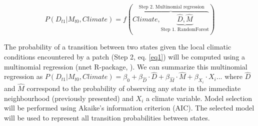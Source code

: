 \begin{equation}
	P(D_{t1}|M_{t0}, Climate) = f(\overbrace{Climate, \underbrace{\hat{D}, \hat{M}}_\text{Step 1. RandomForest}}^\text{ Step 2. Multinomial regression})
\label{eq1}
\end{equation}

The probability of a transition between two states given the local climatic
conditions encountered by a patch (Step 2, eq. \ref{eq1}) will be computed using
a multinomial regression (nnet R-package, \cite{Venables2002}). We can
summarize this multinomial regression as $P(D_{t1}|M_{t0},Climate) = \beta_0 +
\beta_{\hat{D}} \cdot \hat{D} + \beta_{\hat{M}} \cdot \hat{M} + \beta_{X_i}
\cdot X_i... $ where $\hat{D}$ and $\hat{M}$ correspond to the probability of
observing any state in the immediate neighbourhood (previously presented) and
$X_i$ a climate variable. Model selection will be performed using Akaike's
information criterion (AIC). The selected model will be used to represent all
transition probabilities between states. \\

